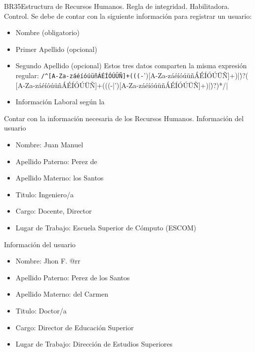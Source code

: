 \begin{BussinesRule}{BR35}{Estructura de Recursos Humanos.}
    \BRitem[Tipo:] Regla de integridad.
    \BRitem[Clase:] Habilitadora.
    \BRitem[Nivel:] Control.
    \BRitem[Descripción:]Se debe de contar con la siguiente información para registrar un usuario:
    \begin{itemize}
        \item Nombre (obligatorio)
        \item Primer Apellido (opcional)
        \item Segundo Apellido (opcional)
        Estos tres datos comparten la misma expresión regular:
        \verb|/^[A-Za-záéíóúüñÁÉÍÓÚÜÑ]+(((-|')[A-Za-záéíóúüñÁÉÍÓÚÜÑ]+)|\.)?( [A-Za-záéíóúüñÁÉÍÓÚÜÑ]+(((-|')[A-Za-záéíóúüñÁÉÍÓÚÜÑ]+)|\.)?)*/|
        \item Información Laboral según la 
    \end{itemize}
    \BRitem[Motivación:] Contar con la información necesaria de los Recursos Humanos.
     Información del usuario
    \begin{itemize}
        \item Nombre: Juan Manuel
        \item Apellido Paterno: Perez de
        \item Apellido Materno: los Santos
        \item Titulo: Ingeniero/a
        \item Cargo: Docente, Director
        \item Lugar de Trabajo: Escuela Superior de Cómputo (ESCOM)
    \end{itemize}
     Información del usuario
    \begin{itemize}
        \item Nombre: Jhon F. @rr
        \item Apellido Paterno: Perez de los Santos
        \item Apellido Materno: del Carmen
        \item Titulo: Doctor/a
        \item Cargo: Director de Educación Superior
        \item Lugar de Trabajo: Dirección de Estudios Superiores
    \end{itemize}
 \end{BussinesRule}

